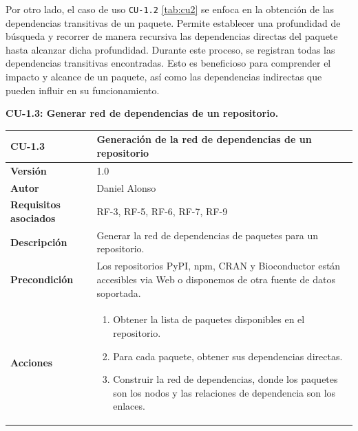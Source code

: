 Por otro lado, el caso de uso \texttt{CU-1.2} \ref{tab:cu2} se enfoca en la obtención de las dependencias transitivas de un paquete.
Permite establecer una profundidad de búsqueda y recorrer de manera recursiva las dependencias directas del
paquete hasta alcanzar dicha profundidad. Durante este proceso, se registran todas las dependencias transitivas
encontradas. Esto es beneficioso para comprender el impacto y alcance de un paquete, así como las dependencias
indirectas que pueden influir en su funcionamiento.


\textbf{CU-1.3: Generar red de dependencias de un repositorio.}

\begin{table}[p]
	\centering
	\begin{tabularx}{\linewidth}{ p{} p{} }
		\toprule
		\textbf{CU-1.3}               & \textbf{Generación de la red de dependencias de un repositorio}                                                          \\
		\toprule
		\textbf{Versión}              & 1.0                                                                                                                      \\
		\textbf{Autor}                & Daniel Alonso                                                                                                            \\
		\textbf{Requisitos asociados} & RF-3, RF-5, RF-6, RF-7, RF-9                                                                                             \\
		\textbf{Descripción}          & Generar la red de dependencias de paquetes para un repositorio.                                                           \\
		\textbf{Precondición}         & Los repositorios PyPI, npm, CRAN y Bioconductor están accesibles via Web o disponemos de otra fuente de datos soportada. \\
		\textbf{Acciones}             &
		\begin{enumerate}
			\def\labelenumi{\arabic{enumi}.}
			\tightlist
			\item Obtener la lista de paquetes disponibles en el repositorio.
			\item Para cada paquete, obtener sus dependencias directas.
			\item Construir la red de dependencias, donde los paquetes son los nodos y las relaciones de dependencia son los enlaces.
		\end{enumerate}                                 \\

\end{tabularx}
\end{table}
